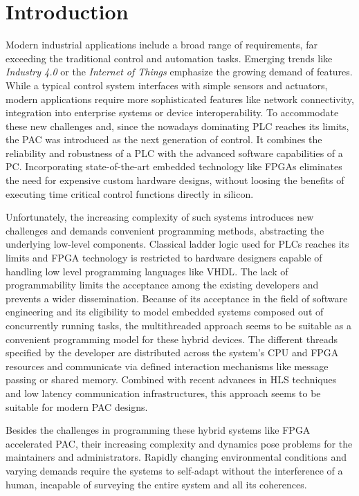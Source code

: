 \chapter{Introduction}

Modern industrial applications include a broad range of requirements, far
exceeding the traditional control and automation tasks. Emerging trends like
\emph{Industry 4.0} or the \emph{Internet of Things} emphasize the growing
demand of features. While a typical control system interfaces with simple
sensors and actuators, modern applications require more sophisticated features
like network connectivity, integration into enterprise systems or device
interoperability. To accommodate these new challenges and, since the nowadays
dominating \ac{PLC} reaches its limits, the \ac{PAC} was introduced as the
next generation of control. It combines the reliability and robustness of a
\ac{PLC} with the advanced software capabilities of a \ac{PC}. Incorporating
state-of-the-art embedded technology like \acp{FPGA} eliminates the need for
expensive custom hardware designs, without loosing the benefits of executing
time critical control functions directly in silicon.

Unfortunately, the increasing complexity of such systems introduces new
challenges and demands convenient programming methods, abstracting the
underlying low-level components. Classical ladder logic used for \acp{PLC}
reaches its limits and \ac{FPGA} technology is restricted to hardware
designers capable of handling low level programming languages like \ac{VHDL}.
The lack of programmability limits the acceptance among the existing
developers and prevents a wider dissemination. Because of its acceptance in
the field of software engineering and its eligibility to model embedded
systems composed out of concurrently running tasks, the multithreaded approach
seems to be suitable as a convenient programming model for these hybrid
devices. The different threads specified by the developer are distributed
across the system's \ac{CPU} and \ac{FPGA} resources and communicate via
defined interaction mechanisms like message passing or shared memory. Combined
with recent advances in \ac{HLS} techniques and low latency communication
infrastructures, this approach seems to be suitable for modern \ac{PAC}
designs.

Besides the challenges in programming these hybrid systems like \ac{FPGA}
accelerated \acs{PAC}, their increasing complexity and dynamics pose problems
for the maintainers and administrators. Rapidly changing environmental
conditions and varying demands require the systems to self-adapt without the
interference of a human, incapable of surveying the entire system and all its
coherences.

